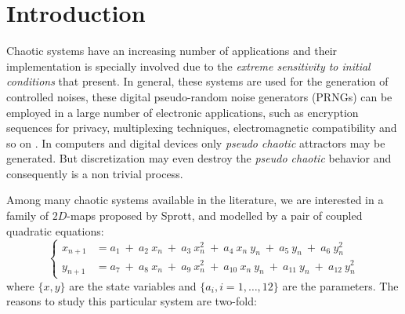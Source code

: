 \section{Introduction} \label{sec:intro}

%
%

Chaotic systems have an increasing number of applications and their implementation is specially involved due to the \textsl{extreme sensitivity to initial conditions} that present. In general, 
these systems are used for the generation of controlled noises, these digital pseudo-random noise generators (PRNGs) 
can be employed in a large number of electronic applications, such as encryption sequences for privacy, multiplexing techniques, 
electromagnetic compatibility and so on \cite{DeMicco2007A,DeMicco2007C,DeMicco2007B}. In computers and digital devices only \textsl{pseudo chaotic} attractors may be generated. But discretization may even destroy the \textsl{pseudo chaotic} behavior and consequently is a non trivial process. 

Among many chaotic systems available in the literature, we are interested in a family of $2D$-maps \cite{Sprott1993} proposed by Sprott,  and modelled by a pair of coupled quadratic equations:
%
\begin{equation}\label{eq:mapaSprott}
 \left\{\begin{aligned}
        x_{n+1}&=a_1~+~a_2~ x_n~+~a_3 ~x_n^2~+~a_4 ~x_n~ y_n~+~a_5 ~y_n~+~a_6~ y_n^2\\
        y_{n+1}&=a_7~+~a_8~ x_n~+~a_9 ~x_n^2~+~a_{10} ~x_n~ y_n~+~a_{11} ~y_n~+~a_{12}~ y_n^2
       \end{aligned}
 \right.
\end{equation}
%
where $\{x,y\}$ are the state variables and $\{a_i, i=1,\dots,12\}$
are the parameters. The reasons to study this particular system are two-fold: 

